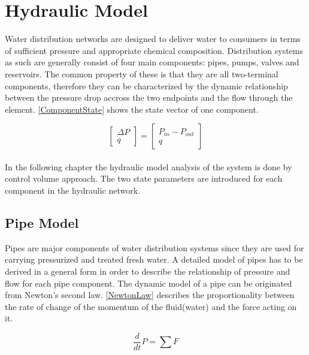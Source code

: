 \section{Hydraulic Model}
\label{HydraulicModel}

Water distribution networks are designed to deliver water to consumers in terms of sufficient pressure and appropriate chemical composition. Distribution systems as such are generally consist of four main components: pipes, pumps, valves and reservoirs. The common property of these is that they are all two-terminal components, therefore they can be characterized by the dynamic relationship between the pressure drop accross the two endpoints and the flow through the element. \cite{Kallesoe2009}  \eqref{ComponentState} shows the state vector of one component. 

\begin{equation}
\label{ComponentState}
 \begin{bmatrix}
    \Delta P \\
    q
\end{bmatrix}
=
 \begin{bmatrix}
    P_{in} - P_{out} \\
    q
\end{bmatrix}
\end{equation}
\\
In the following chapter the hydraulic model analysis of the system is done by control volume approach. \cite{Hunt_Fluidmechanics} 
The two state parameters are introduced for each component in the hydraulic network.

\subsection{Pipe Model} 
\label{PipeModel}
Pipes are major components of water distribution systems since they are used for carrying pressurized and treated fresh water. A detailed model of pipes has to be derived in a general form in order to describe the relationship of pressure and flow for each pipe component.  
%
The dynamic model of a pipe can be originated from Newton's second law. \eqref{NewtonLaw} describes the proportionality between the rate of change of the momentum of the fluid(water) and the force acting on it.

\begin{equation}
  \frac{d}{dt} P = \sum F
  \label{NewtonLaw}
\end{equation} 

